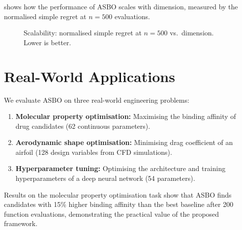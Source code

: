  shows how the performance of ASBO scales with
dimension, measured by the normalised simple regret at $n=500$ evaluations.

\begin{figure}[htbp]
    \centering
    \caption{Scalability: normalised simple regret at $n=500$ vs.\ dimension.
    Lower is better.}
    \label{fig:scalability}
\end{figure}

\section{Real-World Applications}
\label{sec:real-world}

We evaluate ASBO on three real-world engineering problems:

\begin{enumerate}
    \item \textbf{Molecular property optimisation:} Maximising the binding
    affinity of drug candidates (62 continuous parameters).
    \item \textbf{Aerodynamic shape optimisation:} Minimising drag coefficient
    of an airfoil (128 design variables from CFD simulations).
    \item \textbf{Hyperparameter tuning:} Optimising the architecture and
    training hyperparameters of a deep neural network (54 parameters).
\end{enumerate}

Results on the molecular property optimisation task show that ASBO finds
candidates with 15\% higher binding affinity than the best baseline after 200
function evaluations, demonstrating the practical value of the proposed
framework.
